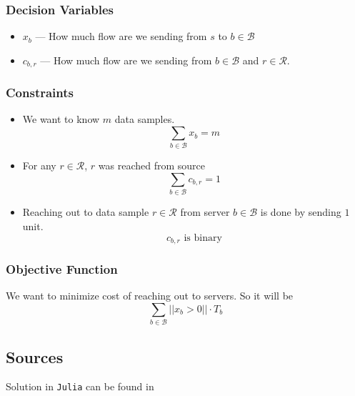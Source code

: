 \subsubsection*{Decision Variables}
\begin{itemize}
    \item $x_b$ --- How much flow are we sending from $s$ to $b \in \mathcal{B}$
    \item $c_{b,r}$ --- How much flow are we sending from $b \in \mathcal{B}$ and $r \in \mathcal{R}$. 
\end{itemize}
\subsubsection*{Constraints}
\begin{itemize}
    \item We want to know $m$ data samples.
    $$\sum_{b \in \mathcal{B}} x_b = m$$
    \item For any $r \in \mathcal{R}$, $r$ was reached from source
    $$\sum_{b \in \mathcal{B}} c_{b,r} = 1$$
    \item Reaching out to data sample $r \in \mathcal{R}$ from server $b \in \mathcal{B}$ is done by sending $1$ unit.
    $$c_{b,r} \textrm{ is binary}$$
\end{itemize}
\subsubsection*{Objective Function}
We want to minimize cost of reaching out to servers. So it will be 
$$
\sum_{b \in \mathcal{B}}  || x_b > 0 || \cdot T_b
$$
\subsection{Sources}
Solution in \texttt{Julia} can be found in 

